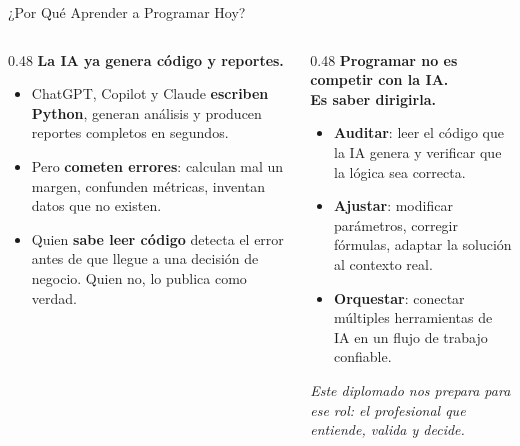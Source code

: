 \documentclass[aspectratio=169, 11pt]{beamer}
\begin{document}
\begin{frame}{¿Por Qué Aprender a Programar Hoy?}
  \vspace{-4pt}
  {\footnotesize
  \begin{columns}[T]
    \begin{column}{0.48\textwidth}
      {\small\color{arcaDark}\bfseries La IA ya genera código y reportes.}

      \vspace{6pt}
      \begin{itemize}\setlength{\itemsep}{6pt}
        \item[{\color{arcaRed}\scriptsize\faRobot}]
          ChatGPT, Copilot y Claude \textbf{escriben Python}, generan análisis
          y producen reportes completos en segundos.

        \item[{\color{arcaRed}\scriptsize\faExclamationTriangle}]
          Pero \textbf{cometen errores}: calculan mal un margen,
          confunden métricas, inventan datos que no existen.

        \item[{\color{arcaRed}\scriptsize\faUserShield}]
          Quien \textbf{sabe leer código} detecta el error antes de
          que llegue a una decisión de negocio.
          Quien no, lo publica como verdad.
      \end{itemize}
    \end{column}

    \begin{column}{0.48\textwidth}
      {\small\color{arcaDark}\bfseries Programar no es competir con la IA.\\
      Es saber dirigirla.}

      \vspace{6pt}
      \begin{itemize}\setlength{\itemsep}{6pt}
        \item[{\color{arcaRed}\scriptsize\faSearch}]
          \textbf{Auditar}: leer el código que la IA genera y
          verificar que la lógica sea correcta.

        \item[{\color{arcaRed}\scriptsize\faSlidersH}]
          \textbf{Ajustar}: modificar parámetros, corregir fórmulas,
          adaptar la solución al contexto real.

        \item[{\color{arcaRed}\scriptsize\faProjectDiagram}]
          \textbf{Orquestar}: conectar múltiples herramientas
          de IA en un flujo de trabajo confiable.
      \end{itemize}

      \vspace{6pt}
      {\scriptsize\color{textMuted}\itshape
        Este diplomado nos prepara para ese rol:
        el profesional que entiende, valida y decide.}
    \end{column}
  \end{columns}
  }
\end{frame}
\end{document}
